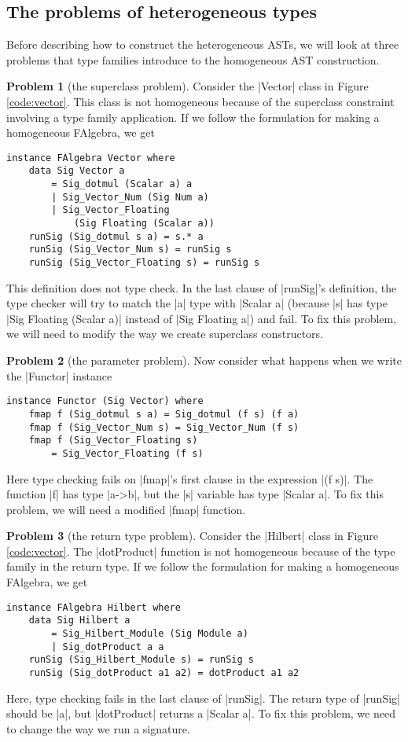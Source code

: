 \documentclass[preprint]{sigplanconf}
\theoremstyle{definition}
\newtheorem{problem}{Problem}
\begin{document}
\subsection{The problems of heterogeneous types}
\label{sec:het.probs}
Before describing how to construct the heterogeneous ASTs,
we will look at three problems that type families introduce to the homogeneous AST construction.

\begin{problem}[the superclass problem]
Consider the |Vector| class in Figure \ref{code:vector}.
This class is not homogeneous because of the superclass constraint involving a type family application.
If we follow the formulation for making a homogeneous FAlgebra, we get
\begin{lstlisting}
instance FAlgebra Vector where
    data Sig Vector a
        = Sig_dotmul (Scalar a) a
        | Sig_Vector_Num (Sig Num a)
        | Sig_Vector_Floating
            (Sig Floating (Scalar a))
    runSig (Sig_dotmul s a) = s.* a
    runSig (Sig_Vector_Num s) = runSig s
    runSig (Sig_Vector_Floating s) = runSig s
\end{lstlisting}
This definition does not type check.
In the last clause of |runSig|'s definition,
the type checker will try to match the |a| type with |Scalar a| (because |s| has type |Sig Floating (Scalar a)| instead of |Sig Floating a|) and fail.
To fix this problem, we will need to modify the way we create superclass constructors.
\end{problem}

\begin{problem}[the parameter problem]
Now consider what happens when we write the |Functor| instance
\begin{lstlisting}
instance Functor (Sig Vector) where
    fmap f (Sig_dotmul s a) = Sig_dotmul (f s) (f a)
    fmap f (Sig_Vector_Num s) = Sig_Vector_Num (f s)
    fmap f (Sig_Vector_Floating s)
        = Sig_Vector_Floating (f s)
\end{lstlisting}
Here type checking fails on |fmap|'s first clause in the expression |(f s)|.
The function |f| has type |a->b|, but the |s| variable has type |Scalar a|.
To fix this problem, we will need a modified |fmap| function.
\end{problem}

\begin{problem}[the return type problem]
Consider the |Hilbert| class in Figure \ref{code:vector}.
The |dotProduct| function is not homogeneous because of the type family in the return type.
If we follow the formulation for making a homogeneous FAlgebra, we get
\begin{lstlisting}
instance FAlgebra Hilbert where
    data Sig Hilbert a
        = Sig_Hilbert_Module (Sig Module a)
        | Sig_dotProduct a a
    runSig (Sig_Hilbert_Module s) = runSig s
    runSig (Sig_dotProduct a1 a2) = dotProduct a1 a2
\end{lstlisting}
Here, type checking fails in the last clause of |runSig|.
The return type of |runSig| should be |a|,
but |dotProduct| returns a |Scalar a|.
To fix this problem, we need to change the way we run a signature.
\end{problem}
\end{document}
